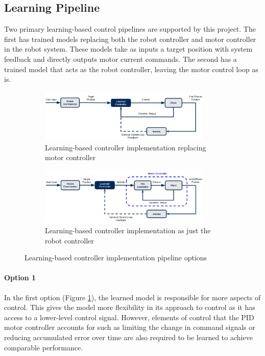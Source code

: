 \subsection{Learning Pipeline}
Two primary learning-based control pipelines are supported by this project. The first has trained models replacing both the robot controller and motor controller in the robot system. These models take as inputs a target position with system feedback and directly outputs motor current commands. The second has a trained model that acts as the robot controller, leaving the motor control loop as is.  

\begin{figure}[H]
     \centering
     \begin{subfigure}[b]{\textwidth}
         \centering
         \includegraphics[width=0.9\textwidth]{images/learned_option1.png}
         \caption{Learning-based controller implementation replacing motor controller}
         \label{fig:learning_model1}
     \end{subfigure}
     \hfill
     \begin{subfigure}[b]{\textwidth}
         \centering
         \includegraphics[width=0.9\textwidth]{images/learned_option2.png}
         \caption{Learning-based controller implementation as just the robot controller}
         \label{fig:learning_model2}
     \end{subfigure}
        \caption{Learning-based controller implementation pipeline options}
        \label{fig:learning_model_options}
\end{figure}

\paragraph{Option 1} 
In the first option (Figure \ref{fig:learning_model1}), the learned model is responsible for more aspects of control. This gives the model more flexibility in its approach to control as it has access to a lower-level control signal. However, elements of control that the PID motor controller accounts for such as limiting the change in command signals or reducing accumulated error over time are also required to be learned to achieve comparable performance. 

